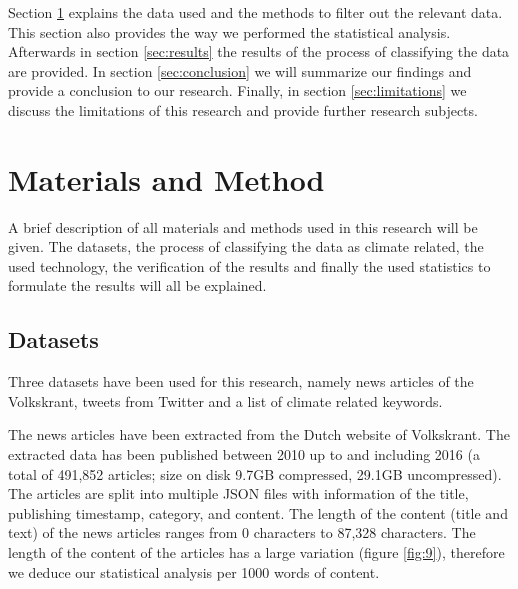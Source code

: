 \documentclass[paper=a4, fontsize=9px]{scrartcl} %
\numberwithin{equation}{section} %
\numberwithin{figure}{section} %
\numberwithin{table}{section} %
\begin{document}
\begin{multicols}{2}
Section \ref{sec:method} explains the data used and the methods to filter out the relevant data. This section also provides the way we performed the statistical analysis.
Afterwards in section \ref{sec:results} the results of the process of classifying the data are provided. In section \ref{sec:conclusion} we will summarize our findings and provide a conclusion to our research. Finally, in section \ref{sec:limitations} we discuss the limitations of this research and provide further research subjects.


\section{Materials and Method}\label{sec:method}

A brief description of all materials and methods used in this research will be given. The datasets, the process of classifying the data as climate related, the used technology, the verification of the results and finally the used statistics to formulate the results will all be explained.


\subsection{Datasets}

Three datasets have been used for this research, namely news articles of the Volkskrant, tweets from Twitter and a list of climate related keywords.

The news articles have been extracted from the Dutch website of Volkskrant. The extracted data has been published between 2010 up to and including 2016 (a total of 491,852 articles; size on disk 9.7GB compressed, 29.1GB uncompressed). The articles are split into multiple JSON files with information of the title, publishing timestamp, category, and content. The length of the content (title and text) of the news articles ranges from 0 characters to 87,328 characters. The length of the content of the articles has a large variation (figure \ref{fig:9}), therefore we deduce our statistical analysis per 1000 words of content.


\end{multicols}
\end{document}
